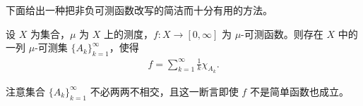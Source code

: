 \documentclass[../../main.tex]{subfiles}
\begin{document}
下面给出一种把非负可测函数改写的简洁而十分有用的方法。

\begin{theorem}[非负可测函数的分解]\label{theorem:ch01-1-12}
设 $X$ 为集合，$\mu$ 为 $X$ 上的测度，$f:X\to[0,\infty]$ 为 $\mu$-可测函数。则存在 $X$ 中的一列 $\mu$-可测集 $\{A_{k}\}_{k=1}^{\infty}$，使得
\begin{align*}
f=\sum_{k=1}^{\infty}\frac{1}{k}\chi_{A_{k}}.
\end{align*}
\end{theorem}

\begin{remark}\label{remark:ch01-thm-1-12-说明}
注意集合 $\{A_{k}\}_{k=1}^{\infty}$ 不必两两不相交，且这一断言即使 $f$ 不是简单函数也成立。
\end{remark}
\end{document}
